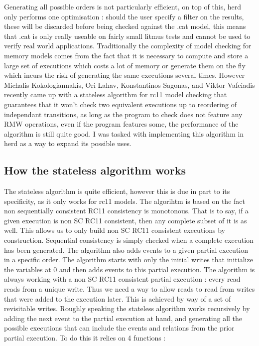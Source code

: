 \documentclass[a4,12pt]{article}
\begin{document}


Generating all possible orders is not particularly efficient, on top of this, herd only performs one optimisation : should the user specify a filter on the results, these will be discarded before being checked against the .cat model, this means that .cat is only really useable on fairly small litmus tests and cannot be used to verify real world applications. Traditionally the complexity of model checking for memory models comes from the fact that it is necessary to compute and store a large set of executions which costs a lot of memory or generate them on the fly which incurs the risk of generating the same executions several times. However Michalis Kokologiannakis, Ori Lahav, Konstantinos Sagonas, and Viktor Vafeiadis recently came up with a stateless algorithm for rc11 model checking that guarantees that it won't check two equivalent executions up to reordering of independant transitions, as long as the program to check does not feature any RMW operations, even if the program features some, the performance of the algorithm is still quite good. I was tasked with implementing this algorithm in herd as a way to expand its possible uses.

\subsection{How the stateless algorithm works}

The stateless algorithm is quite efficient, however this is due in part to its specificity, as it only works for rc11 models. The algorihtm is based on the fact non sequentially consistent RC11 consistency is monotonous. That is to say, if a given execution is non SC RC11 consistent, then any complete subset of it is as well. This allows us to only build non SC RC11 consistent executions by construction. Sequential consistency is simply checked when a complete execution has been generated. The algorithm also adds events to a given partial execution in a specific order. The algorithm starts with only the initial writes that initialize the variables at 0 and then adds events to this partial execution. The algorithm is always working with a non SC RC11 consistent partial execution : every read reads from a unique write. Thus we need a way to allow reads to read from writes that were added to the execution later. This is achieved by way of a set of revisitable writes.
Roughly speaking the stateless algorithm works recursively by adding the next event to the partial execution at hand, and generating all the possible executions that can include the events and relations from the prior partial execution. To do this it relies on 4 functions :
\end{document}
